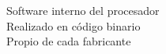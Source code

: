 \documentclass[preview]{standalone}
\begin{document}
Software interno del procesador\\Realizado en código binario\\Propio de cada fabricante\\
\end{document}
